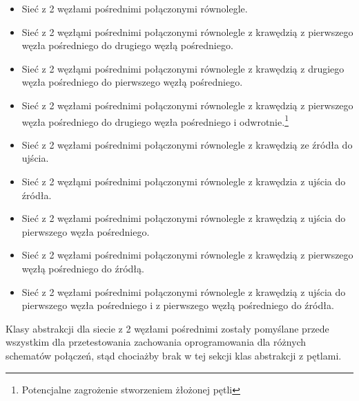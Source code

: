 \documentclass[10pt]{dokument-tiwo}
\begin{document}
\begin{itemize}
    \item Sieć z 2 węzłami pośrednimi połączonymi równolegle.
    \item Sieć z 2 węzłąmi pośrednimi połączonymi równolegle z krawędzią z pierwszego węzła pośredniego do drugiego węzłą pośredniego.
    \item Sieć z 2 węzłąmi pośrednimi połączonymi równolegle z krawędzią z drugiego węzła pośredniego do pierwszego węzłą pośredniego.
    \item Sieć z 2 węzłami pośrednimi połączonymi równolegle z krawędzią z pierwszego węzła pośredniego do drugiego węzła pośredniego i odwrotnie.\footnote{Potencjalne zagrożenie stworzeniem żłożonej pętli}
    \item Sieć z 2 węzłami pośrednimi połączonymi równolegle z krawędzią ze źródła do ujścia.
    \item Sieć z 2 węzłąmi pośrednimi połączonymi równolegle z krawędzia z ujścia do źródła.
    \item Sieć z 2 węzłami pośrednimi połączonymi równolegle z krawędzią z ujścia do pierwszego węzła pośredniego.
    \item Sieć z 2 węzłami pośrednimi połączonymi równolegle z krawędzią z pierwszego węzłą pośredniego do źródłą.
    \item Sieć z 2 węzłami pośrednimi połączonymi równolegle z krawędzią z ujścia do pierwszego węzła pośredniego i z pierwszego węzłą pośredniego do źródła.
\end{itemize}
Klasy abstrakcji dla siecie z 2 węzłami pośrednimi zostały pomyślane przede wszystkim dla przetestowania zachowania oprogramowania dla różnych schematów połączeń, stąd chociażby brak w tej sekcji klas abstrakcji z pętlami.
\end{document}
